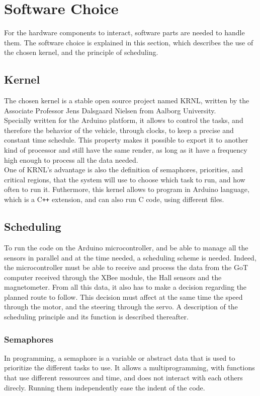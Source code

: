 \section{Software Choice}
For the hardware components to interact, software parts are needed to handle them. The software choice is explained in this section, which describes the use of the chosen kernel, and the principle of scheduling.

\subsection{Kernel}
The chosen kernel is a stable open source project named KRNL, written by the Associate Professor Jens Dalsgaard Nielsen from Aalborg University.\\
Specially written for the Arduino platform, it allows to control the tasks, and therefore the behavior of the vehicle, through clocks, to keep a precise and constant time schedule. This property makes it possible to export it to another kind of processor and still have the same render, as long as it have a frequency high enough to process all the data needed.\\
One of KRNL's advantage is also the definition of semaphores, priorities, and critical regions, that the system will use to choose which task to run, and how often to run it. Futhermore, this kernel allows to program in Arduino language, which is a C\texttt{++} extension, and can also run C code, using different files.

\subsection{Scheduling}\label{sec:scheduling}
To run the code on the Arduino microcontroller, and be able to manage all the sensors in parallel and at the time needed, a scheduling scheme is needed. Indeed, the microcontroller must be able to receive and process the data from the GoT computer received through the XBee module, the Hall sensors and the magnetometer. From all this data, it also has to make a decision regarding the planned route to follow. This decision must affect at the same time the speed through the motor, and the steering through the servo.
A description of the scheduling principle and its function is described thereafter.


\subsubsection{Semaphores}
In programming, a semaphore is a variable or abstract data that is used to prioritize the different tasks to use. It allows a multiprogramming, with functions that use different ressources and time, and does not interact with each others direcly. Running them independently ease the indent of the code.



